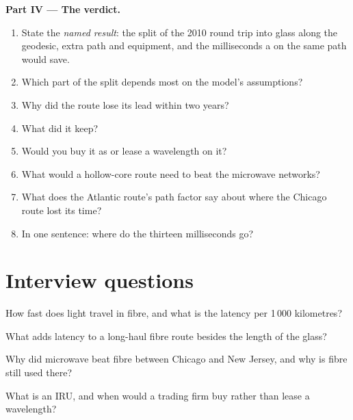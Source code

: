 \begin{problem}
\medskip\noindent\textbf{Part IV --- The verdict.}
\begin{enumerate}[resume]
\item State the \emph{named result}: the split of the 2010 round trip into glass along the geodesic, extra path and equipment, and the milliseconds
  a  on the same path would save.
\item Which part of the split depends most on the model's assumptions?
\item Why did the route lose its lead within two years?
\item What did it keep?
\item Would you buy it as  or lease a wavelength on it?
\item What would a hollow-core route need to beat the microwave networks?
\item What does the Atlantic route's path factor say about where the Chicago route lost its time?
\item In one sentence: where do the thirteen milliseconds go?
\end{enumerate}
\end{problem}

\section{Interview questions}

\begin{interviewq}\label{iq:nw:long-haul-fibre:1}
How fast does light travel in fibre, and what is the latency per 1\,000 kilometres?
\end{interviewq}

\begin{interviewq}\label{iq:nw:long-haul-fibre:2}
What adds latency to a long-haul fibre route besides the length of the glass?
\end{interviewq}

\begin{interviewq}\label{iq:nw:long-haul-fibre:3}
Why did microwave beat fibre between Chicago and New Jersey, and why is fibre still used there?
\end{interviewq}

\begin{interviewq}\label{iq:nw:long-haul-fibre:4}
What is an IRU, and when would a trading firm buy  rather than lease a wavelength?
\end{interviewq}


